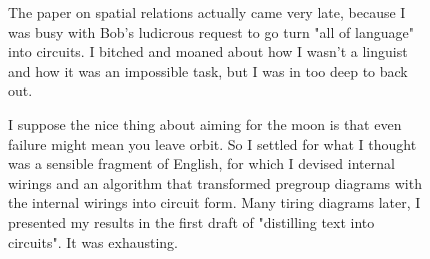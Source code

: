 \begin{figure}[h!]
\centering
{}
\end{figure}

\begin{figure}[h!]
\centering
{}
\caption{The paper on spatial relations actually came very late, because I was busy with Bob's ludicrous request to go turn "all of language" into circuits. I bitched and moaned about how I wasn't a linguist and how it was an impossible task, but I was in too deep to back out.}
\end{figure}

\begin{figure}[h!]
\centering
{}
\caption{I suppose the nice thing about aiming for the moon is that even failure might mean you leave orbit. So I settled for what I thought was a sensible fragment of English, for which I devised internal wirings and an algorithm that transformed pregroup diagrams with the internal wirings into circuit form. Many tiring diagrams later, I presented my results in the first draft of "distilling text into circuits". It was exhausting.}
\end{figure}

